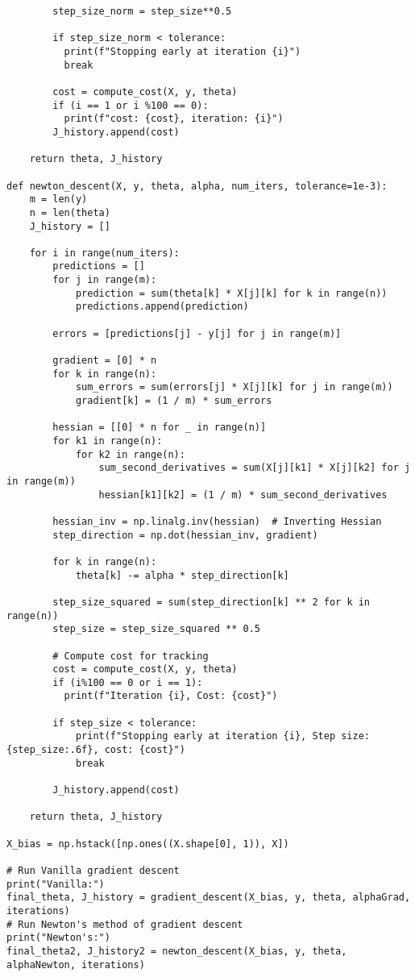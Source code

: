\documentclass[12pt]{article}
\theoremstyle{definition}
\begin{document}
\begin{lstlisting}
        step_size_norm = step_size**0.5

        if step_size_norm < tolerance:
          print(f"Stopping early at iteration {i}")
          break

        cost = compute_cost(X, y, theta)
        if (i == 1 or i %100 == 0):
          print(f"cost: {cost}, iteration: {i}")
        J_history.append(cost)

    return theta, J_history

def newton_descent(X, y, theta, alpha, num_iters, tolerance=1e-3):
    m = len(y)  
    n = len(theta) 
    J_history = []

    for i in range(num_iters):
        predictions = []
        for j in range(m):
            prediction = sum(theta[k] * X[j][k] for k in range(n))
            predictions.append(prediction)

        errors = [predictions[j] - y[j] for j in range(m)]

        gradient = [0] * n
        for k in range(n):
            sum_errors = sum(errors[j] * X[j][k] for j in range(m))
            gradient[k] = (1 / m) * sum_errors

        hessian = [[0] * n for _ in range(n)]
        for k1 in range(n):
            for k2 in range(n):
                sum_second_derivatives = sum(X[j][k1] * X[j][k2] for j in range(m))
                hessian[k1][k2] = (1 / m) * sum_second_derivatives

        hessian_inv = np.linalg.inv(hessian)  # Inverting Hessian
        step_direction = np.dot(hessian_inv, gradient)

        for k in range(n):
            theta[k] -= alpha * step_direction[k]

        step_size_squared = sum(step_direction[k] ** 2 for k in range(n))
        step_size = step_size_squared ** 0.5

        # Compute cost for tracking
        cost = compute_cost(X, y, theta)
        if (i%100 == 0 or i == 1):
          print(f"Iteration {i}, Cost: {cost}")   

        if step_size < tolerance:
            print(f"Stopping early at iteration {i}, Step size: {step_size:.6f}, cost: {cost}")
            break
          
        J_history.append(cost)

    return theta, J_history

X_bias = np.hstack([np.ones((X.shape[0], 1)), X])

# Run Vanilla gradient descent
print("Vanilla:")
final_theta, J_history = gradient_descent(X_bias, y, theta, alphaGrad, iterations)
# Run Newton's method of gradient descent
print("Newton's:")
final_theta2, J_history2 = newton_descent(X_bias, y, theta, alphaNewton, iterations)
\end{lstlisting}
\newpage
\end{document}
